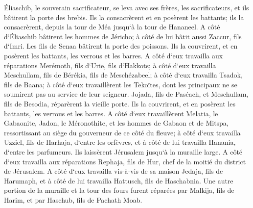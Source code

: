 \verse Éliaschib, le souverain sacrificateur, se leva avec ses frères, les sacrificateurs, et ils bâtirent la porte des brebis. Ils la consacrèrent et en posèrent les battants; ils la consacrèrent, depuis la tour de Méa jusqu`à la tour de Hananeel. 
\verse A côté d`Éliaschib bâtirent les hommes de Jéricho; à côté de lui bâtit aussi Zaccur, fils d`Imri. 
\verse Les fils de Senaa bâtirent la porte des poissons. Ils la couvrirent, et en posèrent les battants, les verrous et les barres. 
\verse A côté d`eux travailla aux réparations Merémoth, fils d`Urie, fils d`Hakkots; à côté d`eux travailla Meschullam, fils de Bérékia, fils de Meschézabeel; à côté d`eux travailla Tsadok, fils de Baana; 
\verse à côté d`eux travaillèrent les Tekoïtes, dont les principaux ne se soumirent pas au service de leur seigneur. 
\verse Jojada, fils de Paséach, et Meschullam, fils de Besodia, réparèrent la vieille porte. Ils la couvrirent, et en posèrent les battants, les verrous et les barres. 
\verse A côté d`eux travaillèrent Melatia, le Gabaonite, Jadon, le Méronothite, et les hommes de Gabaon et de Mitspa, ressortissant au siège du gouverneur de ce côté du fleuve; 
\verse à côté d`eux travailla Uzziel, fils de Harhaja, d`entre les orfèvres, et à côté de lui travailla Hanania, d`entre les parfumeurs. Ils laissèrent Jérusalem jusqu`à la muraille large. 
\verse A côté d`eux travailla aux réparations Rephaja, fils de Hur, chef de la moitié du district de Jérusalem. 
\verse A côté d`eux travailla vis-à-vis de sa maison Jedaja, fils de Harumaph, et à côté de lui travailla Hattusch, fils de Haschabnia. 
\verse Une autre portion de la muraille et la tour des fours furent réparées par Malkija, fils de Harim, et par Haschub, fils de Pachath Moab. 
